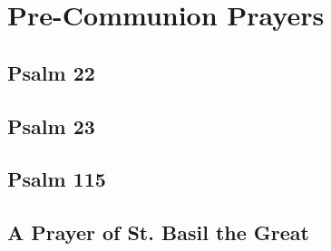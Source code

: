 \section{Pre-Communion Prayers}

\subsection{Psalm 22}



\subsection{Psalm 23}



\subsection{Psalm 115}



\subsection{A Prayer of St. Basil the Great}


